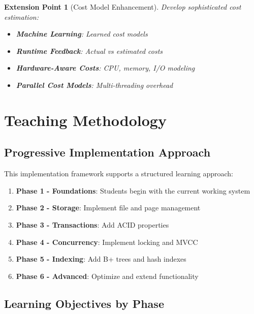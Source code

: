 \documentclass[12pt,a4paper]{article}
\newtheorem{extension}{Extension Point}[section]
\begin{document}
    \begin{extension}[Cost Model Enhancement]
        Develop sophisticated cost estimation:

        \begin{itemize}
            \item \textbf{Machine Learning}: Learned cost models
            \item \textbf{Runtime Feedback}: Actual vs estimated costs
            \item \textbf{Hardware-Aware Costs}: CPU, memory, I/O modeling
            \item \textbf{Parallel Cost Models}: Multi-threading overhead
        \end{itemize}
    \end{extension}

    \section{Teaching Methodology}

    \subsection{Progressive Implementation Approach}

    This implementation framework supports a structured learning approach:

    \begin{enumerate}
        \item \textbf{Phase 1 - Foundations}: Students begin with the current working system
        \item \textbf{Phase 2 - Storage}: Implement file and page management
        \item \textbf{Phase 3 - Transactions}: Add ACID properties
        \item \textbf{Phase 4 - Concurrency}: Implement locking and MVCC
        \item \textbf{Phase 5 - Indexing}: Add B+ trees and hash indexes
        \item \textbf{Phase 6 - Advanced}: Optimize and extend functionality
    \end{enumerate}

    \subsection{Learning Objectives by Phase}
\end{document}
